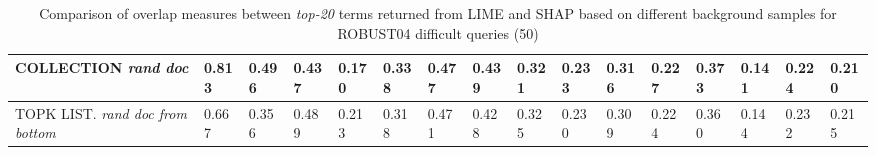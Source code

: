 \begin{table}
{\begin{tabular}{ |m{6em}|m{2em}|m{2em}|m{2em}|m{2em}|m{2.8em}||m{2em}|m{2em}|m{2em}|m{2em}|m{2.8em}||m{2em}|m{2em}|m{2em}|m{2em}|m{2.8em}|| }


COLLECTION \newline \textit{rand doc} & 0.813 & 0.496 & 0.437 & 0.170 & 0.338 & 0.477 & 0.439 & 0.321 & 0.233 & 0.316 & 0.227 & 0.373 & 0.141 & 0.224 & 0.210\\
\hline

TOPK LIST. \newline \textit{rand doc from bottom} & 0.667 & 0.356 & 0.489 & 0.213 & 0.318 & 0.471 & 0.428 & 0.325 & 0.230 & 0.309 & 0.224 & 0.360 & 0.144 & 0.232 & 0.215\\
\hline
 \end{tabular}}
\caption{Comparison of overlap measures between \textit{top-20} terms returned from LIME and SHAP based on different background samples for ROBUST04 difficult queries (50)}
\label{table_diff_20_terms}
\end{table}

